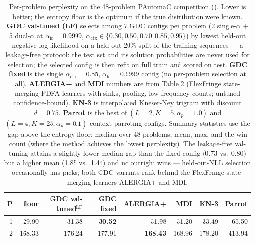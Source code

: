 \begin{table}[t]
\centering
\caption{Per-problem perplexity on the 48-problem PAutomaC competition (\citet{verwer2014pautomac}). Lower is better; the entropy floor is the optimum if the true distribution were known. \textbf{GDC val-tuned (LF)} selects among 7 GDC configs per problem (2 single-$\alpha$ + 5 dual-$\alpha$ at $\alpha_{\mathrm{fc}}{=}0.9999$, $\alpha_{\mathrm{ctx}} \in \{0.30, 0.50, 0.70, 0.85, 0.95\}$) by lowest held-out negative log-likelihood on a held-out 20\% split of the training sequences --- a leakage-free protocol: the test set and its solution probabilities are never used for selection; the selected config is then refit on full train and scored on test. \textbf{GDC fixed} is the single $\alpha_{\mathrm{ctx}}{=}0.85$, $\alpha_{\mathrm{fc}}{=}0.9999$ config (no per-problem selection at all). \textbf{ALERGIA+} and \textbf{MDI} numbers are from \citet{verwer2022flexfringe} Table 2 (FlexFringe state-merging PDFA learners with sinks, pooling, low-frequency counts; untuned confidence-bound). \textbf{KN-3} is interpolated Kneser-Ney trigram with discount $d{=}0.75$. \textbf{Parrot} is the best of $(L{=}2, K{=}5, \alpha_p{=}1.0)$ and $(L{=}4, K{=}25, \alpha_p{=}0.1)$ context-parroting configs. Summary statistics use the gap above the entropy floor: median over 48 problems, mean, max, and the win count (where the method achieves the lowest perplexity). The leakage-free val-tuning attains a slightly lower median gap than the fixed config (0.73 vs.\ 0.80) but a higher mean (1.85 vs.\ 1.44) and no outright wins --- held-out-NLL selection occasionally mis-picks; both GDC variants rank behind the FlexFringe state-merging learners ALERGIA+ and MDI.}
\label{tab:pautomac_perplexity}
\small
\begin{tabular}{r r r r r r r r}
\toprule
P & floor & GDC val-tuned$^{\mathrm{LF}}$ & GDC fixed & ALERGIA+ & MDI & KN-3 & Parrot \\
\midrule
 1 & 29.90  & 31.38           & \textbf{30.52}  & 31.98   & 31.20   & 33.49   & 65.50  \\
 2 & 168.33 & 176.24          & 177.91          & \textbf{168.43} & 168.96  & 178.20  & 413.94 \\

\end{tabular}
\end{table}
